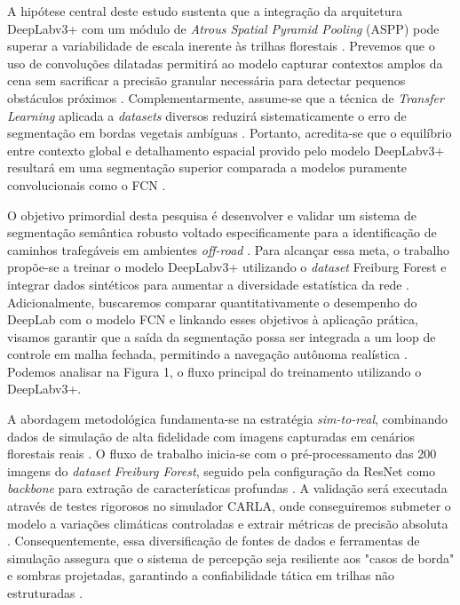 \documentclass[a4paper,10pt, twocolumn]{article}
\begin{document}
A hipótese central deste estudo sustenta que a integração da arquitetura DeepLabv3+ 
com um módulo de \textit{Atrous Spatial Pyramid Pooling} (ASPP) pode superar a 
variabilidade de escala inerente às trilhas florestais \cite{LATEEF2019321, Sgibnev2020}. Prevemos 
que o uso de convoluções dilatadas permitirá ao modelo capturar contextos amplos da cena sem sacrificar a precisão 
granular necessária para detectar pequenos obstáculos próximos \cite{LATEEF2019321, BEYCIMEN2026113680, Sgibnev2020}. Complementarmente, 
assume-se que a técnica de \textit{Transfer Learning} aplicada a \textit{datasets} diversos reduzirá sistematicamente o erro de segmentação em bordas vegetais ambíguas \cite{s19112577, Sgibnev2020}. Portanto, 
acredita-se que o equilíbrio entre contexto global e detalhamento espacial provido pelo modelo DeepLabv3+ resultará em uma 
segmentação superior comparada a modelos puramente convolucionais como o FCN \cite{Sgibnev2020, BEYCIMEN2026113680}.

O objetivo primordial desta pesquisa é desenvolver e validar um sistema de segmentação 
semântica robusto voltado especificamente para a identificação de caminhos trafegáveis 
em ambientes \textit{off-road} \cite{10742323, Maturana2017}. Para alcançar essa meta, 
o trabalho propõe-se a treinar o modelo DeepLabv3+ utilizando o \textit{dataset} Freiburg 
Forest e integrar dados sintéticos para aumentar a diversidade estatística da rede \cite{Sgibnev2020, s19112577}. 
Adicionalmente, buscaremos comparar quantitativamente o desempenho do DeepLab com o modelo FCN e linkando esses 
objetivos à aplicação prática, visamos garantir que a saída da segmentação possa ser 
integrada a um loop de controle em malha fechada, permitindo a navegação autônoma realística \cite{10.1145/3729420, BEYCIMEN2026113680}.
Podemos analisar na Figura 1, o fluxo principal do treinamento utilizando o DeepLabv3+.

A abordagem metodológica fundamenta-se na estratégia \textit{sim-to-real}, combinando 
dados de simulação de alta fidelidade com imagens capturadas em cenários 
florestais reais \cite{s26061944, Sgibnev2020, KABIR2025102644}. O fluxo de trabalho 
inicia-se com o pré-processamento das 200 imagens do \textit{dataset} \textit{Freiburg Forest}, 
seguido pela configuração da ResNet como \textit{backbone} para extração de 
características profundas \cite{s19112577, Sgibnev2020, LATEEF2019321}. A validação 
será executada através de testes rigorosos no simulador CARLA, onde conseguiremos 
submeter o modelo a variações climáticas controladas e extrair métricas de 
precisão absoluta \cite{10.1145/3729420, BEYCIMEN2026113680}. Consequentemente, 
essa diversificação de fontes de dados e ferramentas de simulação assegura que o sistema de 
percepção seja resiliente aos "casos de borda" e sombras projetadas, garantindo a confiabilidade 
tática em trilhas não estruturadas \cite{KABIR2025102644, s19112577}.
\end{document}
